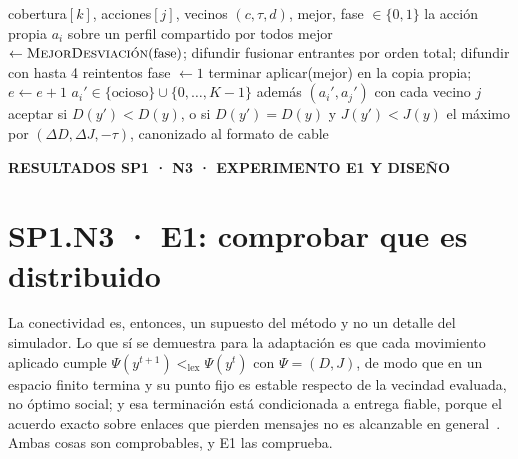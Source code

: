 \documentclass[12pt,a4paper]{article}
\newcommand{\leveltag}[1]{%
  \noindent\colorbox{VIUDark}{%
    \parbox{\dimexpr\textwidth-2\fboxsep\relax}{%
      \color{white}\sffamily\bfseries\small #1%
    }%
  }\par\smallskip
}
\begin{document}
\begin{algorithm}[H]
\caption{Weighted-GRAPE: época $e$ del robot $i$. Pair-GRAPE añade la fase 1.}
\label{alg:n3-grape}
\begin{algorithmic}[1]
\Require cobertura$[k]$, acciones$[j]$, vecinos $(c,\tau,d)$, mejor, fase $\in\{0,1\}$
\Ensure la acción propia $a_i$ sobre un perfil compartido por todos
 mejor $\gets \textsc{MejorDesviación}(\text{fase})$; difundir \EndIf
{}
  \State fusionar entrantes por orden total; difundir con hasta 4 reintentos
\EndIf
{}
     fase $\gets 1$
    \Else{} terminar 
    \EndIf
  \Else{} aplicar(mejor) en la copia propia; $e \gets e + 1$
  \EndIf
\EndIf
\Statex
{}
  \State $a_i' \in \{\text{ocioso}\} \cup \{0,\dots,K{-}1\}$ 
   además $(a_i', a_j')$ con cada vecino $j$
  \EndIf
  \State aceptar si $D(y') < D(y)$, o si $D(y') = D(y)$ y $J(y') < J(y)$
  \State \Return el máximo por $(\Delta D, \Delta J, -\tau)$, canonizado al formato de cable
\EndFunction
\end{algorithmic}
\end{algorithm}


\clearpage

\leveltag{RESULTADOS SP1 · N3 · EXPERIMENTO E1 Y DISEÑO}
\section*{SP1.N3 · E1: comprobar que es distribuido}

La conectividad es, entonces, un supuesto del método y no un detalle del
simulador. Lo que sí se demuestra para la adaptación es que cada movimiento
aplicado cumple $\Psi(y^{t+1})<_{\mathrm{lex}}\Psi(y^{t})$ con $\Psi=(D,J)$, de
modo que en un espacio finito termina y su punto fijo es estable respecto de la
vecindad evaluada, no óptimo social; y esa terminación está condicionada a
entrega fiable, porque el acuerdo exacto sobre enlaces que pierden mensajes no es
alcanzable en general~\parencite{halpernMoses1990Knowledge}. Ambas cosas son
comprobables, y E1 las comprueba.
\end{document}
